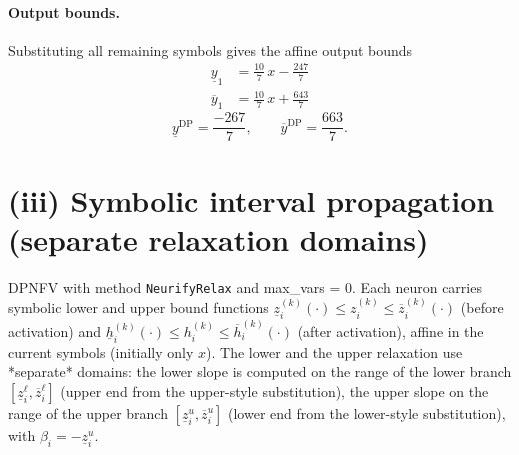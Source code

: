 \documentclass[11pt]{article}
\begin{document}
\paragraph{Output bounds.}
Substituting all remaining symbols gives the affine output bounds
\begin{align*}
\underline{y}_{1} &= \frac{10}{7}\,x - \frac{247}{7}
\end{align*}
\begin{align*}
\overline{y}_{1} &= \frac{10}{7}\,x + \frac{643}{7}
\end{align*}
\begin{equation*}
\underline{y}^{\text{DP}} = \frac{-267}{7}, \qquad \overline{y}^{\text{DP}} = \frac{663}{7}.
\end{equation*}

\section{(iii) Symbolic interval propagation (separate relaxation domains)}
DPNFV with method \texttt{NeurifyRelax} and max\_vars = 0. Each neuron carries symbolic lower and upper bound functions
$\underline{z}^{(k)}_i(\cdot) \le z^{(k)}_i \le \overline{z}^{(k)}_i(\cdot)$ (before activation)
and $\underline{h}^{(k)}_i(\cdot) \le h^{(k)}_i \le \overline{h}^{(k)}_i(\cdot)$ (after activation),
affine in the current symbols (initially only $x$).
The lower and the upper relaxation use *separate* domains:
the lower slope is computed on the range of the lower branch
$[\underline{z}^{\ell}_i, \overline{z}^{\ell}_i]$ (upper end from the upper-style substitution),
the upper slope on the range of the upper branch
$[\underline{z}^{u}_i, \overline{z}^{u}_i]$ (lower end from the lower-style substitution),
with $\beta_i = -\underline{z}^{u}_i$.
\end{document}
